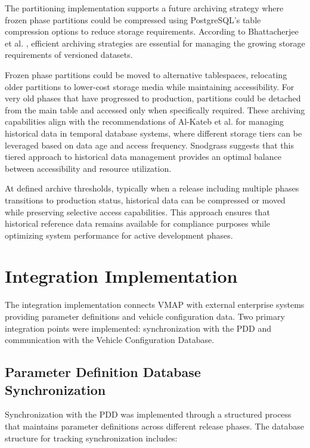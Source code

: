 The partitioning implementation supports a future archiving strategy where frozen phase partitions could be compressed using PostgreSQL's table compression options to reduce storage requirements. According to Bhattacherjee et al. \cite{bhattacherjee2015principles}, efficient archiving strategies are essential for managing the growing storage requirements of versioned datasets.

Frozen phase partitions could be moved to alternative tablespaces, relocating older partitions to lower-cost storage media while maintaining accessibility. For very old phases that have progressed to production, partitions could be detached from the main table and accessed only when specifically required. These archiving capabilities align with the recommendations of Al-Kateb et al. \cite{al2013temporal} for managing historical data in temporal database systems, where different storage tiers can be leveraged based on data age and access frequency. Snodgrass \cite{snodgrass1999developing} suggests that this tiered approach to historical data management provides an optimal balance between accessibility and resource utilization.

At defined archive thresholds, typically when a release including multiple phases transitions to production status, historical data can be compressed or moved while preserving selective access capabilities. This approach ensures that historical reference data remains available for compliance purposes while optimizing system performance for active development phases.


\section{Integration Implementation}
\label{sec:integration-implementation}

The integration implementation connects \ac{VMAP} with external enterprise systems providing parameter definitions and vehicle configuration data. Two primary integration points were implemented: synchronization with the \ac{PDD} and communication with the Vehicle Configuration Database.

\subsection{Parameter Definition Database Synchronization}
\label{subsec:pdd-synchronization}

Synchronization with the \ac{PDD} was implemented through a structured process that maintains parameter definitions across different release phases. The database structure for tracking synchronization includes:

